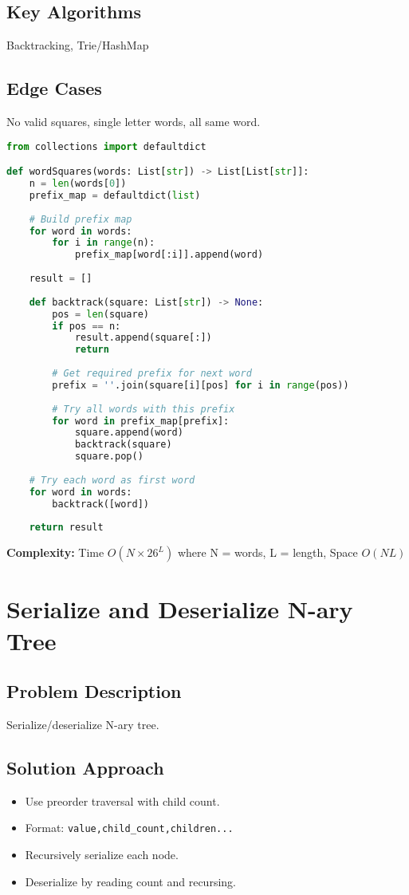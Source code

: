 \documentclass[10pt, a4paper]{article}
\begin{document}
\subsection*{Key Algorithms}
Backtracking, Trie/HashMap

\subsection*{Edge Cases}
No valid squares, single letter words, all same word.

\begin{lstlisting}[language=Python]
from collections import defaultdict

def wordSquares(words: List[str]) -> List[List[str]]:
    n = len(words[0])
    prefix_map = defaultdict(list)
    
    # Build prefix map
    for word in words:
        for i in range(n):
            prefix_map[word[:i]].append(word)
    
    result = []
    
    def backtrack(square: List[str]) -> None:
        pos = len(square)
        if pos == n:
            result.append(square[:])
            return
        
        # Get required prefix for next word
        prefix = ''.join(square[i][pos] for i in range(pos))
        
        # Try all words with this prefix
        for word in prefix_map[prefix]:
            square.append(word)
            backtrack(square)
            square.pop()
    
    # Try each word as first word
    for word in words:
        backtrack([word])
    
    return result
\end{lstlisting}
\textbf{Complexity:} Time $O(N \times 26^L)$ where N = words, L = length, Space $O(NL)$

\section{Serialize and Deserialize N-ary Tree}
\subsection*{Problem Description}
Serialize/deserialize N-ary tree.

\subsection*{Solution Approach}
\begin{itemize}
    \item Use preorder traversal with child count.
    \item Format: \texttt{value,child\_count,children...}
    \item Recursively serialize each node.
    \item Deserialize by reading count and recursing.
\end{itemize}
\end{document}
